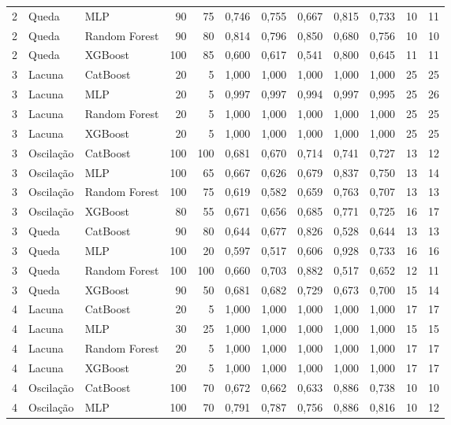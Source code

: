 \begin{longtable}{@{}rllrrrrrrrrr@{}}
2 & Queda & MLP & 90 & 75 & 0,746 & 0,755 & 0,667 & 0,815 & 0,733 & 10 & 11 \\
2 & Queda & Random Forest & 90 & 80 & 0,814 & 0,796 & 0,850 & 0,680 & 0,756 & 10 & 10 \\
2 & Queda & XGBoost & 100 & 85 & 0,600 & 0,617 & 0,541 & 0,800 & 0,645 & 11 & 11 \\
3 & Lacuna & CatBoost & 20 & 5 & 1,000 & 1,000 & 1,000 & 1,000 & 1,000 & 25 & 25 \\
3 & Lacuna & MLP & 20 & 5 & 0,997 & 0,997 & 0,994 & 0,997 & 0,995 & 25 & 26 \\
3 & Lacuna & Random Forest & 20 & 5 & 1,000 & 1,000 & 1,000 & 1,000 & 1,000 & 25 & 25 \\
3 & Lacuna & XGBoost & 20 & 5 & 1,000 & 1,000 & 1,000 & 1,000 & 1,000 & 25 & 25 \\
3 & Oscilação & CatBoost & 100 & 100 & 0,681 & 0,670 & 0,714 & 0,741 & 0,727 & 13 & 12 \\
3 & Oscilação & MLP & 100 & 65 & 0,667 & 0,626 & 0,679 & 0,837 & 0,750 & 13 & 14 \\
3 & Oscilação & Random Forest & 100 & 75 & 0,619 & 0,582 & 0,659 & 0,763 & 0,707 & 13 & 13 \\
3 & Oscilação & XGBoost & 80 & 55 & 0,671 & 0,656 & 0,685 & 0,771 & 0,725 & 16 & 17 \\
3 & Queda & CatBoost & 90 & 80 & 0,644 & 0,677 & 0,826 & 0,528 & 0,644 & 13 & 13 \\
3 & Queda & MLP & 100 & 20 & 0,597 & 0,517 & 0,606 & 0,928 & 0,733 & 16 & 16 \\
3 & Queda & Random Forest & 100 & 100 & 0,660 & 0,703 & 0,882 & 0,517 & 0,652 & 12 & 11 \\
3 & Queda & XGBoost & 90 & 50 & 0,681 & 0,682 & 0,729 & 0,673 & 0,700 & 15 & 14 \\
4 & Lacuna & CatBoost & 20 & 5 & 1,000 & 1,000 & 1,000 & 1,000 & 1,000 & 17 & 17 \\
4 & Lacuna & MLP & 30 & 25 & 1,000 & 1,000 & 1,000 & 1,000 & 1,000 & 15 & 15 \\
4 & Lacuna & Random Forest & 20 & 5 & 1,000 & 1,000 & 1,000 & 1,000 & 1,000 & 17 & 17 \\
4 & Lacuna & XGBoost & 20 & 5 & 1,000 & 1,000 & 1,000 & 1,000 & 1,000 & 17 & 17 \\
4 & Oscilação & CatBoost & 100 & 70 & 0,672 & 0,662 & 0,633 & 0,886 & 0,738 & 10 & 10 \\
4 & Oscilação & MLP & 100 & 70 & 0,791 & 0,787 & 0,756 & 0,886 & 0,816 & 10 & 12 \\

\end{longtable}
